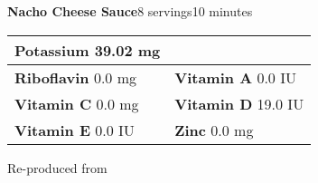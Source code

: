 \documentclass[../recipe-collections/cooking.tex]{subfiles}
\begin{document}
\begin{recipe}{\textbf{Nacho Cheese Sauce}}{8 servings}{10 minutes}
\begin{tabular}{|lr|}
      \multicolumn{1}{|l|}{\textbf{Potassium} \textrm{ 39.02  mg}}     \\ \hline
      \textbf{Riboflavin} \textrm{ 0.0  mg}  &
      \multicolumn{1}{|l|}{\textbf{Vitamin A} \textrm{ 0.0 IU }}        \\ \hline
      \textbf{Vitamin C} \textrm{ 0.0  mg}      &
      \multicolumn{1}{|l|}{\textbf{Vitamin D} \textrm{ 19.0  IU}}         \\ \hline
      \textbf{Vitamin E} \textrm{ 0.0  IU}     &
      \multicolumn{1}{|l|}{\textbf{Zinc} \textrm{ 0.0  mg}}               \\ \hline
  \end{tabular}

  \freeform{}\hrulefill{}

\end{recipe}

Re-produced from  
\autocite{ICantBelieveItsLowCarb_NachoCheeseSauce_2020}
\end{document}
